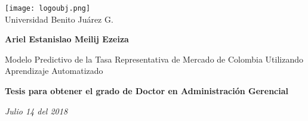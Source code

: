 \begin{titlepage}
\begin{center}
\vspace*{1cm}

\texttt{[image: logoubj.png]} \\
\large{Universidad Benito Juárez G.}

\vspace{3cm}
\textbf{Ariel Estanislao Meilij Ezeiza}

\vspace{3cm}
\huge
Modelo Predictivo de la Tasa Representativa de Mercado de Colombia Utilizando Aprendizaje Automatizado

\vspace{3cm}
\large
\textbf{Tesis para obtener el grado de Doctor en Administración Gerencial}

\vspace{4cm}
\small
\textit{Julio 14 del 2018}

\end{center}
\end{titlepage}
